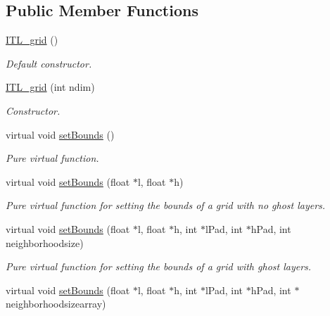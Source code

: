 \subsection*{Public Member Functions}
\begin{DoxyCompactItemize}
\item 
\hyperlink{classITL__grid_a8d06a30e48680ef7c7bd1a86f5008fa4}{ITL\_\-grid} ()
\begin{DoxyCompactList}\small\item\em Default constructor. \item\end{DoxyCompactList}\item 
\hyperlink{classITL__grid_a761ce2ffcfecbebac0abf6abd09c086c}{ITL\_\-grid} (int ndim)
\begin{DoxyCompactList}\small\item\em Constructor. \item\end{DoxyCompactList}\item 
virtual void \hyperlink{classITL__grid_a1df10dfdfddabe79e089aba810eccd8f}{setBounds} ()
\begin{DoxyCompactList}\small\item\em Pure virtual function. \item\end{DoxyCompactList}\item 
virtual void \hyperlink{classITL__grid_a808e49a6b0fe44a13f80df372146ce13}{setBounds} (float $\ast$l, float $\ast$h)
\begin{DoxyCompactList}\small\item\em Pure virtual function for setting the bounds of a grid with no ghost layers. \item\end{DoxyCompactList}\item 
virtual void \hyperlink{classITL__grid_adf6baf011a2d80f49a7e6007bcd190c7}{setBounds} (float $\ast$l, float $\ast$h, int $\ast$lPad, int $\ast$hPad, int neighborhoodsize)
\begin{DoxyCompactList}\small\item\em Pure virtual function for setting the bounds of a grid with ghost layers. \item\end{DoxyCompactList}\item 
virtual void \hyperlink{classITL__grid_aacc7102ddeec002827256c267b7eac38}{setBounds} (float $\ast$l, float $\ast$h, int $\ast$lPad, int $\ast$hPad, int $\ast$neighborhoodsizearray)
\item 

\end{DoxyCompactItemize}
